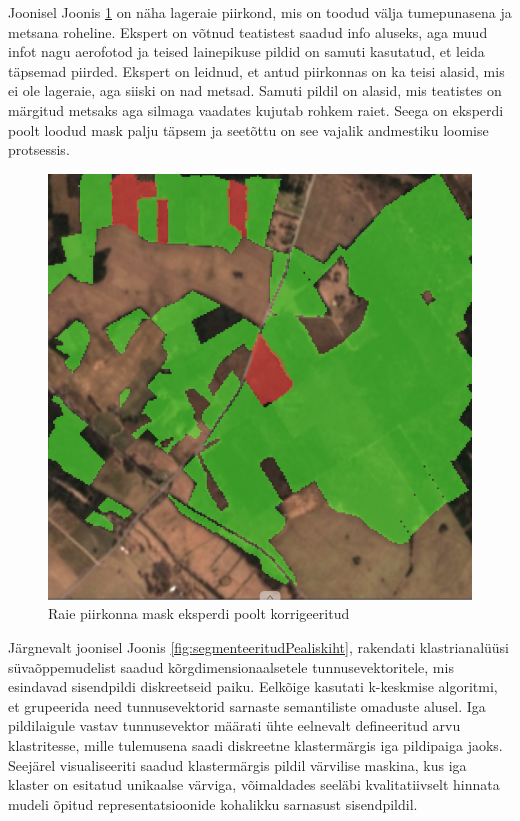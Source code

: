 Joonisel Joonis \ref{fig:raieInfoMask_ekspert} on näha lageraie piirkond, mis on toodud välja tumepunasena ja metsana roheline. Ekspert on võtnud teatistest saadud info aluseks, aga muud infot nagu aerofotod ja teised lainepikuse pildid on samuti kasutatud, et leida täpsemad piirded. Ekspert on leidnud, et antud piirkonnas on ka teisi alasid, mis ei ole lageraie, aga siiski on nad metsad. Samuti pildil on alasid, mis teatistes on märgitud metsaks aga silmaga vaadates kujutab rohkem raiet. Seega on eksperdi poolt loodud mask palju täpsem ja seetõttu on see vajalik andmestiku loomise protsessis.

\begin{figure}[H]
    \centering
    \includegraphics[width=.7\textwidth]{figures/seose_leidmine/raieInfoMask_ekspert.png}
    \caption{Raie piirkonna mask eksperdi poolt korrigeeritud}
    \label{fig:raieInfoMask_ekspert}
\end{figure}

Järgnevalt joonisel Joonis \ref{fig:segmenteeritudPealiskiht}, rakendati klastrianalüüsi süvaõppemudelist saadud
kõrgdimensionaalsetele tunnusevektoritele, mis esindavad sisendpildi
diskreetseid paiku. Eelkõige kasutati k-keskmise algoritmi, et grupeerida need
tunnusevektorid sarnaste semantiliste omaduste alusel. Iga pildilaigule vastav
tunnusevektor määrati ühte eelnevalt defineeritud arvu klastritesse, mille
tulemusena saadi diskreetne klastermärgis iga pildipaiga jaoks. Seejärel
visualiseeriti saadud klastermärgis pildil värvilise maskina, kus iga klaster on
esitatud unikaalse värviga, võimaldades seeläbi kvalitatiivselt hinnata mudeli
õpitud representatsioonide kohalikku sarnasust sisendpildil.

